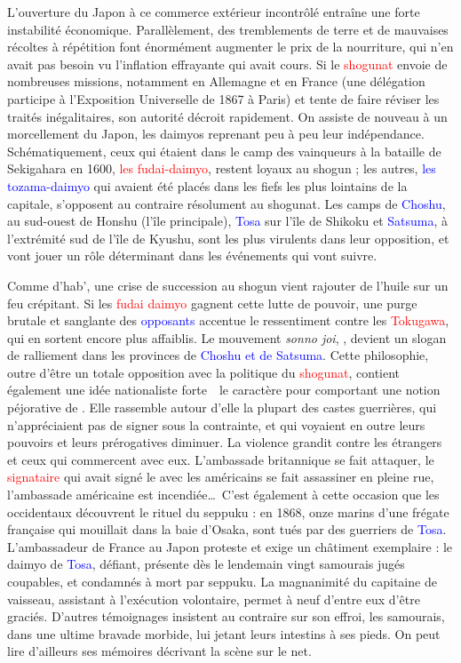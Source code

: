 L'ouverture du Japon à ce commerce extérieur incontrôlé entraîne une forte
instabilité économique. Parallèlement, des tremblements de terre et de
mauvaises récoltes à répétition font énormément augmenter le prix de la
nourriture, qui n'en avait pas besoin vu l'inflation effrayante qui avait
cours. Si le \textcolor{red}{shogunat} envoie de nombreuses missions,
notamment en Allemagne et en France (une délégation participe à l'Exposition
Universelle de 1867 à Paris) et tente de faire réviser les traités
inégalitaires, son autorité décroit rapidement. On assiste de nouveau à un
morcellement du Japon, les daimyos reprenant peu à peu leur indépendance.
Schématiquement, ceux qui étaient dans le camp des vainqueurs à la bataille de
Sekigahara en 1600, \textcolor{red}{les fudai-daimyo}, restent loyaux au
shogun ; les autres, \textcolor{blue}{les tozama-daimyo }qui avaient été
placés dans les fiefs les plus lointains de la capitale, s'opposent au
contraire résolument au shogunat. Les camps de \textcolor{blue}{Choshu}, au
sud-ouest de Honshu (l'île principale), \textcolor{blue}{Tosa} sur l'île de
Shikoku et \textcolor{blue}{Satsuma}, à l'extrémité sud de l'île de Kyushu,
sont les plus virulents dans leur opposition, et vont jouer un rôle
déterminant dans les événements qui vont suivre.

Comme d'hab', une crise de succession au shogun vient rajouter de l'huile sur
un feu crépitant. Si les \textcolor{red}{fudai daimyo} gagnent cette lutte de
pouvoir, une purge brutale et sanglante des \textcolor{blue}{opposants}
accentue le ressentiment contre les \textcolor{red}{Tokugawa}, qui en sortent
encore plus affaiblis. Le mouvement \emph{sonno joi}, , devient un slogan de ralliement dans les provinces de
\textcolor{blue}{Choshu et de Satsuma}. Cette philosophie, outre d'être un
totale opposition avec la politique du \textcolor{red}{shogunat}, contient
également une idée nationaliste forte~\incise~le caractère pour 
comportant une notion péjorative de . Elle rassemble autour d'elle
la plupart des castes guerrières, qui n'appréciaient pas de signer sous la
contrainte, et qui voyaient en outre leurs pouvoirs et leurs prérogatives
diminuer. La violence grandit contre les étrangers et ceux qui commercent avec
eux. L'ambassade britannique se fait attaquer, le \textcolor{red}{signataire}
qui avait signé le  avec les américains se
fait assassiner en pleine rue, l'ambassade américaine est incendiée\dots\ C'est
également à cette occasion que les occidentaux découvrent le rituel du seppuku
: en 1868, onze marins d'une frégate française qui mouillait dans la baie
d'Osaka, sont tués par des guerriers de \textcolor{blue}{Tosa}. L'ambassadeur
de France au Japon proteste et exige un châtiment exemplaire : le daimyo de
\textcolor{blue}{Tosa}, défiant, présente dès le lendemain vingt samourais
jugés coupables, et condamnés à mort par seppuku. La magnanimité du capitaine
de vaisseau, assistant à l'exécution volontaire, permet à neuf d'entre eux
d'être graciés. D'autres témoignages insistent au contraire sur son effroi, les
samourais, dans une ultime bravade morbide, lui jetant leurs intestins à ses
pieds. On peut lire d'ailleurs ses mémoires décrivant la scène sur le net.

